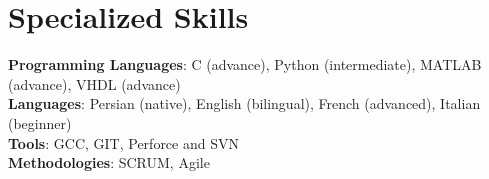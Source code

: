 \documentclass[letterpaper,11pt]{article}
\begin{document}
\section{Specialized Skills}
\begin{itemize}[leftmargin=0.15in, label={}]
    \normalsize{\item{
     \textbf{Programming Languages}{: C (advance), Python (intermediate), MATLAB (advance), VHDL (advance)} \\
     \textbf{Languages}{: Persian (native), English (bilingual), French (advanced), Italian (beginner)}\\
     \textbf{Tools}{: GCC, GIT, Perforce and SVN} \\
     \textbf{Methodologies}{: SCRUM, Agile} \\
    }}
 \end{itemize}
\end{document}
